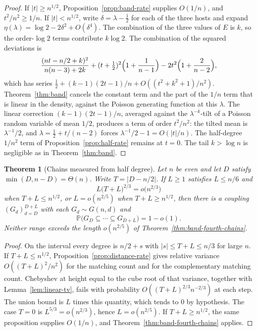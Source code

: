 \documentclass[11pt]{article}
\newtheorem{theorem}{Theorem}
\newcommand{\PP}{\mathbb{P}}
\begin{document}
\begin{proof}
If \(|t|\ge n^{1/2}\), Proposition~\ref{prop:band-rate} supplies \(O(1/n)\), and \(t^2/n^2\ge 1/n\).
If \(|t|<n^{1/2}\), write \(\delta=\lambda-\tfrac12\) for each of the three hosts and expand \(\eta(\lambda)=\log 2-2\delta^2+O(\delta^4)\).
The combination of the three values of \(E\) is \(k\), so the order-\(\log 2\) terms contribute \(k\log 2\).
The combination of the squared deviations is
\[
\frac{(nt-n/2+k)^2}{n(n-3)+2k}+(t+\tfrac12)^2\Bigl(1+\frac1{n-1}\Bigr)-2t^2\Bigl(1+\frac2{n-2}\Bigr),
\]
which has series \(\tfrac12+(k-1)(2t-1)/n+O((t^2+k^2+1)/n^2)\).
Theorem~\ref{thm:band} cancels the constant term and the part of the \(1/n\) term that is linear in the density, against the Poisson generating function at this \(\lambda\).
The linear correction \((k-1)(2t-1)/n\), averaged against the \(\lambda^{-k}\)-tilt of a Poisson random variable of mean \(1/2\), produces a term of order \(t^2/n^2\): the tilted mean is \(\lambda^{-1}/2\), and \(\lambda=\tfrac12+t/(n-2)\) forces \(\lambda^{-1}/2-1=O(|t|/n)\).
The half-degree \(1/n^2\) term of Proposition~\ref{prop:half-rate} remains at \(t=0\).
The tail \(k>\log n\) is negligible as in Theorem~\ref{thm:band}.
\end{proof}

\begin{theorem}[Chains measured from half degree]
\label{thm:distance-chains}
Let \(n\) be even and let \(D\) satisfy \(\min(D,n-D)=\Theta(n)\).
Write \(T=|D-n/2|\).
If \(L\ge 1\) satisfies \(L\le n/6\) and
\[
L\bigl(T+L\bigr)^{2/3}=o\bigl(n^{2/3}\bigr)
\]
when \(T+L\le n^{1/2}\), or \(L=o(n^{2/5})\) when \(T+L\ge n^{1/2}\), then there is a coupling \((G_d)_{d=D}^{D+L}\) with each \(G_d\sim G(n,d)\) and
\[
\PP\bigl(G_D\subseteq\cdots\subseteq G_{D+L}\bigr)=1-o(1).
\]
Neither range exceeds the length \(o(n^{2/5})\) of Theorem~\ref{thm:band-fourth-chains}.
\end{theorem}

\begin{proof}
On the interval every degree is \(n/2+s\) with \(|s|\le T+L\le n/3\) for large \(n\).
If \(T+L\le n^{1/2}\), Proposition~\ref{prop:distance-rate} gives relative variance \(O((T+L)^2/n^2)\) for the matching count and for the complementary matching count.
Chebyshev at height equal to the cube root of that variance, together with Lemma~\ref{lem:linear-tv}, fails with probability \(O((T+L)^{2/3}n^{-2/3})\) at each step.
The union bound is \(L\) times this quantity, which tends to \(0\) by hypothesis.
The case \(T=0\) is \(L^{5/3}=o(n^{2/3})\), hence \(L=o(n^{2/5})\).
If \(T+L\ge n^{1/2}\), the same proposition supplies \(O(1/n)\), and Theorem~\ref{thm:band-fourth-chains} applies.
\end{proof}
\end{document}
